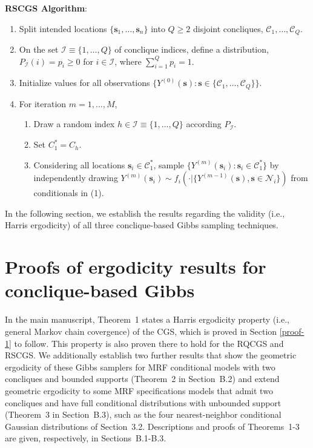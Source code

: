\documentclass[12pt]{article}
\providecommand{\tightlist}{%
  \setlength{\itemsep}{0pt}\setlength{\parskip}{0pt}}
\theoremstyle{definition}
\begin{document}
\noindent \textbf{RSCGS Algorithm}: \vspace*{-.2cm}
\begin{enumerate}
\def\labelenumi{\Alph{enumi}.}
\tightlist
\item
  Split intended locations $\{\boldsymbol s_1,\ldots, \boldsymbol s_n\}$ into \(Q \geq 2\) disjoint concliques,
  \(\mathcal{C}_1,\ldots,\mathcal{C}_Q\).
\
  \item On the set $\mathcal{I}\equiv\{1,\ldots,Q\}$ of  conclique indices, define a
 distribution, $P_\mathcal{I}(i) =p_i \geq 0$ for $i \in\mathcal{I}$,  where $\sum_{i=1}^{Q}p_i=1$.

  \item
  Initialize  values for all observations
  \(\{Y^{(0)}(\boldsymbol s): \boldsymbol s \in \{\mathcal{C}_1, \dots, \mathcal{C}_Q\}\}\).
\item
  For iteration \(m = 1, \dots, M\),
  \begin{enumerate}
  \def\labelenumii{\arabic{enumii}.}
  \tightlist

  \item Draw a random index $h\in \mathcal{I}\equiv\{1,\ldots,Q\}$ according  $P_\mathcal{I}$.
   \item Set $C^*_1 = C_{h}$.
  \item
    Considering all locations \(\boldsymbol s_i \in \mathcal{C}_1^*\),
    sample
    \(\{Y^{(m)}(\boldsymbol s_i) : \boldsymbol s_i \in \mathcal{C}_1^* \}\)
    by independently drawing
    \(Y^{(m)}(\boldsymbol s_i) \sim f_i(\cdot|\{Y^{(m-1)}(\boldsymbol s), \boldsymbol s \in \mathcal{N}_i\})\)
    from conditionals in (1).\\

  \end{enumerate}
\end{enumerate}
 In the following section, we establish the  results  regarding    the validity (i.e., Harris ergodicity) of all three conclique-based Gibbs sampling techniques.



\renewcommand\theequation{B.\arabic{equation}}

\section{Proofs of ergodicity results for conclique-based Gibbs}\label{appendix-ergodicity}

In the main manuscript, Theorem~1 states a Harris ergodicity property (i.e., general Markov chain covergence) of the CGS, which is proved in Section \ref{proof-1} to follow. This property is also proven there to hold for the RQCGS and RSCGS.  We additionally establish two further results that show the geometric ergodicity of these Gibbs samplers for MRF conditional models with two concliques and bounded supports (Theorem~2 in Section~B.2) and extend geometric ergodicity to some MRF specifications models that admit two concliques and have full conditional distributions with unbounded support (Theorem~3 in Section~B.3), such as the four nearest-neighbor conditional Gaussian distributions of Section~3.2. Descriptions and proofs of Theorems~1-3  are given, respectively, in Sections~B.1-B.3.
\end{document}
